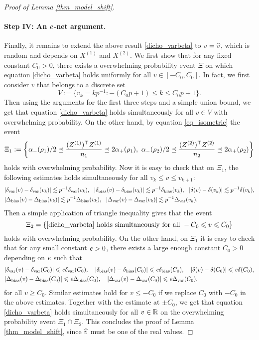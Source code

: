 \begin{proof}[Proof of Lemma \ref{thm_model_shift}]
\paragraph{Step IV: An $\e$-net argument.} Finally, it remains to extend the above result \eqref{dicho_varbeta} to $v=\wh v$, which is random and depends on $X^{(1)}$ and $X^{(2)}$. We first show that for any fixed constant $C_0>0$, there exists a overwhelming probability event $\Xi$ on which equation \eqref{dicho_varbeta}
holds uniformly for all $v\in [-C_0, C_0]$. In fact, we first consider $v$ that belongs to a discrete set
$$V:=\{v_k = kp^{-1}: -(C_0p +1)\le k \le C_0p +1\}.$$
Then using the arguments for the first three steps and a simple union bound, we get that equation 
\eqref{dicho_varbeta} holds simultaneously for all $v\in V$ with overwhelming probability. On the other hand, by equation \eqref{eq_isometric} the event
$$\Xi_1:=\left\{ \al_-(\rho_1)/2 \preceq  \frac{(Z^{(1)})^{\top} Z^{(1)}}{n_1}  \preceq   2\al_+(\rho_1) ,\  \al_-(\rho_2)/2 \preceq  \frac{(Z^{(2)})^\top Z^{(2)}}{n_2}  \preceq   2\al_+(\rho_2)\right\}$$
holds with overwhelming probability. Now it is easy to check that on $\Xi_1$, the following estimates holds simultaneously for all $v_k \le v\le v_{k+1}$:
\begin{align*}
& |\delta_{\vari}(v) -\delta_{\vari}(v_k)|\lesssim p^{-1}\delta_{\vari}(v_k),\ \ |\delta_{\bias}(v) -\delta_{\bias}(v_k)|\lesssim p^{-1}\delta_{\bias}(v_k), \ \   |\delta(v)-\delta(v_k)|\lesssim p^{-1}\delta(v_k),\\
& |\Delta_{\bias}(v) -\Delta_{\bias}(v_k)|\lesssim p^{-1}\Delta_{\bias}(v_k),\ \ |\Delta_{\vari}(v) -\Delta_{\vari}(v_k)|\lesssim p^{-1}\Delta_{\vari}(v_k).
\end{align*}
Then a simple application of triangle inequality gives that the event
$$\Xi_2=\{\eqref{dicho_varbeta} \text{ holds simultaneously for all }-C_0\le v \le C_0\}$$
holds with overwhelming probability. On the other hand, on $\Xi_1$ it is easy to check that for any small constant $\e>0$, there exists a large enough constant $C_0>0$ depending on $\e$ such that
\begin{align*}
& |\delta_{\vari}(v) -\delta_{\vari}(C_0)|\le \e\delta_{\vari}(C_0),\quad |\delta_{\bias}(v) -\delta_{\bias}(C_0)|\le \e\delta_{\bias}(C_0), \quad  |\delta(v)-\delta(C_0)|\le \e\delta(C_0),\\
& |\Delta_{\bias}(v) -\Delta_{\bias}(C_0)|\le \e\Delta_{\bias}(C_0),\quad |\Delta_{\vari}(v) -\Delta_{\vari}(C_0)|\le \e\Delta_{\vari}(C_0),
\end{align*}
for all $v\ge C_0$. Similar estimates hold for $v\le -C_0$ if we replace $C_0$ with $-C_0$ in the above estimates. Together with the estimate at $\pm C_0$, we get that equation \eqref{dicho_varbeta} holds simultaneously for all $v\in \R$ on the overwhelming probability event $\Xi_1\cap \Xi_2$. This concludes the proof of Lemma \ref{thm_model_shift}, since $\wh v$ must be one of the real values.
\end{proof}


